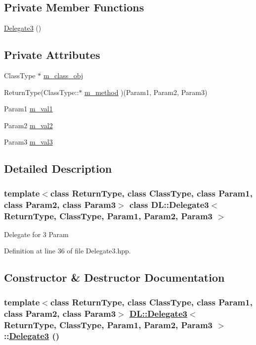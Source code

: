 \subsection*{Private Member Functions}
\begin{CompactItemize}
\item 
\hyperlink{classDL_1_1Delegate3_d0}{Delegate3} ()
\end{CompactItemize}
\subsection*{Private Attributes}
\begin{CompactItemize}
\item 
Class\-Type $\ast$ \hyperlink{classDL_1_1Delegate3_r0}{m\_\-class\_\-obj}
\item 
Return\-Type(Class\-Type::$\ast$ \hyperlink{classDL_1_1Delegate3_r1}{m\_\-method} )(Param1, Param2, Param3)
\item 
Param1 \hyperlink{classDL_1_1Delegate3_r2}{m\_\-val1}
\item 
Param2 \hyperlink{classDL_1_1Delegate3_r3}{m\_\-val2}
\item 
Param3 \hyperlink{classDL_1_1Delegate3_r4}{m\_\-val3}
\end{CompactItemize}


\subsection{Detailed Description}
\subsubsection*{template$<$class Return\-Type, class Class\-Type, class Param1, class Param2, class Param3$>$ class DL::Delegate3$<$ Return\-Type, Class\-Type, Param1, Param2, Param3 $>$}

Delegate for 3 Param



Definition at line 36 of file Delegate3.hpp.

\subsection{Constructor \& Destructor Documentation}
\hypertarget{classDL_1_1Delegate3_d0}{
\subsubsection[Delegate3]{\setlength{\rightskip}{0pt plus 5cm}template$<$class Return\-Type, class Class\-Type, class Param1, class Param2, class Param3$>$ \hyperlink{classDL_1_1Delegate3}{DL::Delegate3}$<$ Return\-Type, Class\-Type, Param1, Param2, Param3 $>$::\hyperlink{classDL_1_1Delegate3}{Delegate3} ()}}
\label{classDL_1_1Delegate3_d0}




